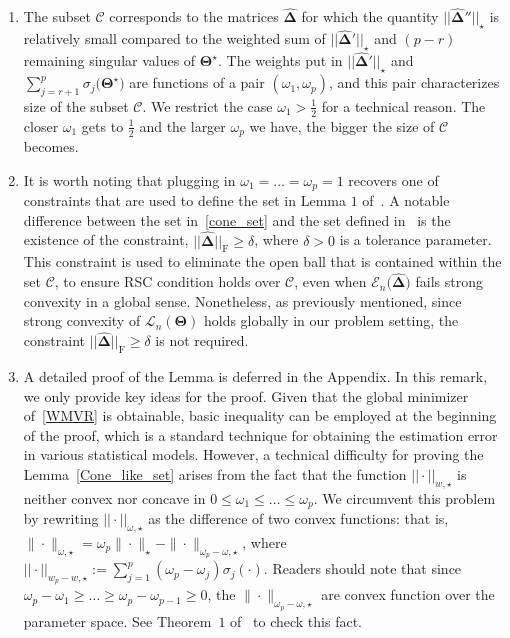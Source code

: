 \documentclass[alpha-refs]{wiley-article}
\begin{document}
\begin{enumerate}
    \item The subset $\mathcal{C}$ corresponds to the matrices $\boldsymbol{\widehat{\Delta}}$ for which the quantity $||\boldsymbol{\widehat{\Delta}}''||_{\star}$ is relatively small compared to the weighted sum of $||\boldsymbol{\widehat{\Delta}}'||_{\star}$ and $(p-r)$ remaining singular values of $\boldsymbol{\Theta}^{\star}$.
    The weights put in $||\boldsymbol{\widehat{\Delta}}'||_{\star}$ and $\sum_{j=r+1}^{p}\sigma_{j}\big(\boldsymbol{\Theta^{\star}}\big)$ are functions of a pair $(\omega_{1},\omega_{p})$, and this pair characterizes size of the subset $\mathcal{C}$.
    We restrict the case $\omega_{1} > \frac{1}{2}$ for a technical reason.
    The closer $\omega_{1}$ gets to $\frac{1}{2}$ and the larger $\omega_{p}$ we have, the bigger the size of $\mathcal{C}$  becomes.

    \item It is worth noting that plugging in $\omega_{1}=\dots=\omega_{p}=1$ recovers one of constraints that are used to define the set in Lemma $1$ of~\citet{negahban2011estimation}.
    A notable difference between the set in~\eqref{cone_set} and the set defined in~\citet{negahban2011estimation} is the existence of the constraint, $||\boldsymbol{\widehat{\Delta}}||_{\text{F}} \geq \delta$, where $\delta>0$ is a tolerance parameter.
    This constraint is used to eliminate the open ball that is contained within the set $\mathcal{C}$, to ensure RSC condition holds over $\mathcal{C}$, even when $\mathcal{E}_{n}\big(\boldsymbol{\widehat{\Delta}})$ fails strong convexity in a global sense.
    Nonetheless, as previously mentioned, since strong convexity of $\mathcal{L}_{n}(\boldsymbol{\Theta})$ holds globally in our problem setting, the constraint $||\boldsymbol{\widehat{\Delta}}||_{\text{F}} \geq \delta$ is not required.

    \item A detailed proof of the Lemma is deferred in the Appendix.
    In this remark, we only provide key ideas for the proof.
    Given that the global minimizer of~\eqref{WMVR} is obtainable, basic inequality can be employed at the beginning of the proof,
    which is a standard technique for obtaining the estimation error in various statistical models.
    However, a technical difficulty for proving the Lemma~\ref{Cone_like_set} arises from the fact that the function $|| \cdot ||_{w,\star}$ is neither convex nor concave in $0\leq \omega_{1}\leq\dots \leq \omega_{p}$.
    We circumvent this problem by rewriting $|| \cdot ||_{\omega,\star}$ as the difference of two convex functions: that is,
    $\| \cdot \|_{\omega,\star} = \omega_{p} \| \cdot \|_{\star} - \| \cdot \|_{\omega_{p}-\omega,\star}$,
    where $|| \cdot ||_{w_{p}-w,\star}:=\sum_{j=1}^{p}(\omega_{p}-\omega_{j})\sigma_{j}(\cdot)$.
    Readers should note that since $\omega_{p}-\omega_{1} \geq \dots \geq \omega_{p}-\omega_{p-1}\geq 0$, the $\| \cdot \|_{\omega_{p}-\omega,\star}$ are convex function over the parameter space.
    See Theorem~$1$ of~\cite{chen2013reduced} to check this fact.
\end{enumerate}
\end{document}

